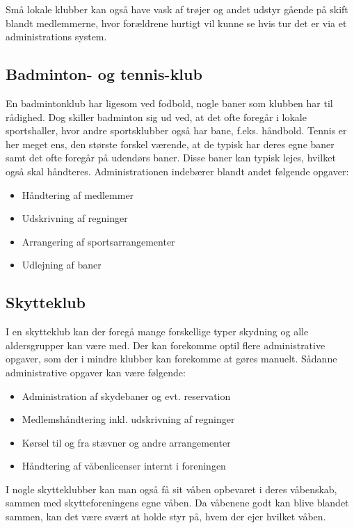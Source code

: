 Små lokale klubber kan også have vask af trøjer og andet udstyr gående på skift blandt medlemmerne, hvor forældrene
hurtigt vil kunne se hvis tur det er via et administrations system.

\subsection{Badminton- og tennis-klub}

En badmintonklub har ligesom ved fodbold, nogle baner som klubben har til rådighed. Dog skiller badminton sig ud ved, at
det ofte foregår i lokale sportshaller, hvor andre sportsklubber også har bane, f.eks. håndbold. Tennis er her meget
ens, den største forskel værende, at de typisk har deres egne baner samt det ofte foregår på udendørs baner. Disse baner kan
typisk lejes, hvilket også skal håndteres. Administrationen indebærer blandt andet følgende opgaver:

\begin{itemize}
\item Håndtering af medlemmer
\item Udskrivning af regninger
\item Arrangering af sportsarrangementer
\item Udlejning af baner
\end{itemize}

\subsection{Skytteklub}

I en skytteklub kan der foregå mange forskellige typer skydning og alle aldersgrupper kan være med. Der kan forekomme
optil flere administrative opgaver, som der i mindre klubber kan forekomme at gøres manuelt. Sådanne administrative
opgaver kan være følgende:

\begin{itemize}
\item Administration af skydebaner og evt. reservation
\item Medlemshåndtering inkl. udskrivning af regninger
\item Kørsel til og fra stævner og andre arrangementer
\item Håndtering af våbenlicenser internt i foreningen
\end{itemize}

I nogle skytteklubber kan man også få sit våben opbevaret i deres våbenskab, sammen med skytteforeningens egne våben. Da
våbenene godt kan blive blandet sammen, kan det være svært at holde styr på, hvem der ejer hvilket våben.


